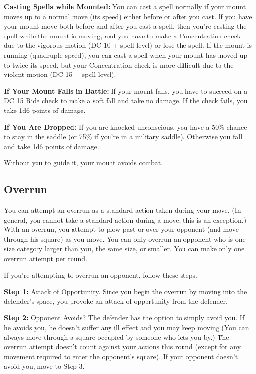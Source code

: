 \textbf{Casting Spells while Mounted:} You can cast a spell normally if your mount 
moves up to a normal move (its speed) either before or after you cast. If you have 
your mount move both before and after you cast a spell, then you're casting the 
spell while the mount is moving, and you have to make a Concentration check due 
to the vigorous motion (DC 10 + spell level) or lose the spell. If the mount is 
running (quadruple speed), you can cast a spell when your mount has moved up to 
twice its speed, but your Concentration check is more difficult due to the violent 
motion (DC 15 + spell level).

\textbf{If Your Mount Falls in Battle:} If your mount falls, you have to succeed 
on a DC 15 Ride check to make a soft fall and take no damage. If the check fails, 
you take 1d6 points of damage.

\textbf{If You Are Dropped:} If you are knocked unconscious, you have a 50\% chance 
to stay in the saddle (or 75\% if you're in a military saddle). Otherwise you fall 
and take 1d6 points of damage.

Without you to guide it, your mount avoids combat.

\subsection{Overrun}

You can attempt an overrun as a standard action taken during your move. (In general, 
you cannot take a standard action during a move; this is an exception.) With an 
overrun, you attempt to plow past or over your opponent (and move through his square) 
as you move. You can only overrun an opponent who is one size category larger than 
you, the same size, or smaller. You can make only one overrun attempt per round.

If you're attempting to overrun an opponent, follow these steps.

\textbf{Step 1:} Attack of Opportunity. Since you begin the overrun by moving into 
the defender's space, you provoke an attack of opportunity from the defender.

\textbf{Step 2:} Opponent Avoids? The defender has the option to simply avoid you. 
If he avoids you, he doesn't suffer any ill effect and you may keep moving (You 
can always move through a square occupied by someone who lets you by.) The overrun 
attempt doesn't count against your actions this round (except for any movement 
required to enter the opponent's square). If your opponent doesn't avoid you, move 
to Step 3.

